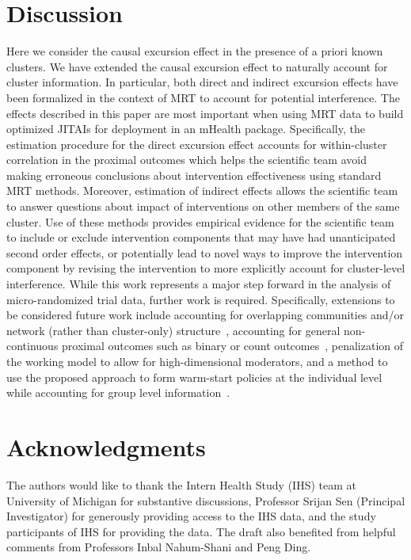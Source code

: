 \documentclass[12pt]{article}
\begin{document}
\section{Discussion}

Here we consider the causal excursion effect in the presence of a priori known clusters.  We have extended the causal excursion effect to naturally account for cluster information. In particular, both direct and indirect excursion effects have been formalized in the context of MRT to account for potential interference.  The effects described in this paper are most important when using MRT data to build optimized JITAIs for deployment in an mHealth package. Specifically, the estimation procedure for the direct excursion effect accounts for within-cluster correlation in the proximal outcomes which helps the scientific team avoid making erroneous conclusions about intervention effectiveness using standard MRT methods.  Moreover, estimation of indirect effects allows the scientific team to answer questions about impact of interventions on other members of the same cluster.  Use of these methods provides empirical evidence for the scientific team to include or exclude intervention components that may have had unanticipated second order effects, or potentially lead to novel ways to improve the intervention component by revising the intervention to more explicitly account for cluster-level interference.  While this work represents a major step forward in the analysis of micro-randomized trial data, further work is required.  Specifically, extensions to be considered future work include accounting for overlapping communities and/or network (rather than cluster-only) structure~\citep{Ogburn2014,Mealli2019}, accounting for general non-continuous proximal outcomes such as binary or count outcomes~\citep{Qian2021}, penalization of the working model to allow for high-dimensional moderators, and a method to use the proposed approach to form warm-start policies at the individual level while accounting for group level information~\citep{Luckett2020}.


\section*{Acknowledgments}
The authors would like to thank the Intern Health Study (IHS) team at University of Michigan for substantive discussions, Professor Srijan Sen (Principal Investigator) for generously providing access to the IHS data, and the study participants of IHS for providing the data.  The draft also benefited from helpful comments from Professors Inbal Nahum-Shani and Peng Ding.
\end{document}
